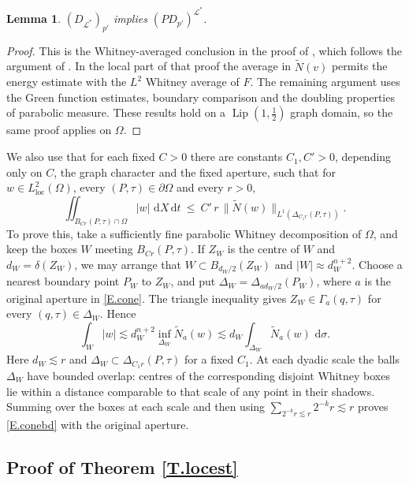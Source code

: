\documentclass[12pt,leqno]{amsart}
\numberwithin{equation}{section}
\DeclareMathOperator{\Lip}{Lip}
\DeclareMathOperator{\loc}{loc}
\newcommand{\abs}[1]{\left\vert#1\right\vert}
\newcommand{\om}{\Omega}
\newcommand{\pom}{\partial\Omega}
\newcommand{\LL}{\mathcal L}
\newcommand{\Nt}{\widetilde N}
\newcommand{\Gam}{\Gamma}
\renewcommand{\d}{\,\mathrm d}
\theoremstyle{plain}
\newtheorem{lemma}[equation]{Lemma}
\theoremstyle{remark}
\begin{document}
\begin{lemma}\label{L.PD}
$(D_{\LL^*})_{p'}$ implies $(PD_{p'})^{\LL^*}$.
\end{lemma}

\begin{proof}
This is the Whitney-averaged conclusion in the proof of
\cite[Lemma 3.8]{DLP2}, which follows the argument of \cite[\S3]{U}. In the
local part of that proof the average in $\Nt(v)$ permits the energy estimate
with the $L^2$ Whitney average of $F$. The remaining argument uses the Green
function estimates, boundary comparison and the doubling properties of
parabolic measure. These results hold on a $\Lip(1,\frac12)$ graph domain, so
the same proof applies on $\om$.
\end{proof}

\noindent We also use that for each fixed $C>0$ there are constants
$C_1,C'>0$, depending only on $C$, the graph character and the fixed aperture,
such that for $w\in L^2_{\loc}(\om)$, every $(P,\tau)\in\pom$ and every $r>0$,
\begin{equation}\label{E.conebd}
  \iint_{B_{Cr}(P,\tau)\cap\om}\abs w\,\d X\d t
  \ \le\ C'\,r\,\big\|\Nt(w)\big\|_{L^1(\Delta_{C_1r}(P,\tau))} .
\end{equation}
To prove this, take a sufficiently fine parabolic Whitney decomposition of
$\om$, and keep the boxes $W$ meeting $B_{Cr}(P,\tau)$. If $Z_W$ is the
centre of $W$ and $d_W=\delta(Z_W)$, we may arrange that
$W\subset B_{d_W/2}(Z_W)$ and $|W|\approx d_W^{n+2}$. Choose a nearest
boundary point $P_W$ to $Z_W$, and put $\Delta_W=\Delta_{ad_W/2}(P_W)$,
where $a$ is the original aperture in \eqref{E.cone}. The triangle inequality
gives $Z_W\in\Gam_a(q,\tau)$ for every $(q,\tau)\in\Delta_W$. Hence
\[
 \int_W|w|\lesssim d_W^{n+2}
       \inf_{\Delta_W}\Nt_a(w)
 \lesssim d_W\int_{\Delta_W}\Nt_a(w)\,\d\sigma.
\]
Here $d_W\lesssim r$ and $\Delta_W\subset\Delta_{C_1r}(P,\tau)$ for a
fixed $C_1$. At each dyadic scale the balls $\Delta_W$ have bounded overlap:
centres of the corresponding disjoint Whitney boxes lie within a distance
comparable to that scale of any point in their shadows. Summing over the
boxes at each scale and then using
$\sum_{2^{-k}r\lesssim r}2^{-k}r\lesssim r$ proves \eqref{E.conebd} with
the original aperture.\medskip

\subsection{Proof of Theorem \ref{T.locest}}\label{ss.locproof}
\end{document}
